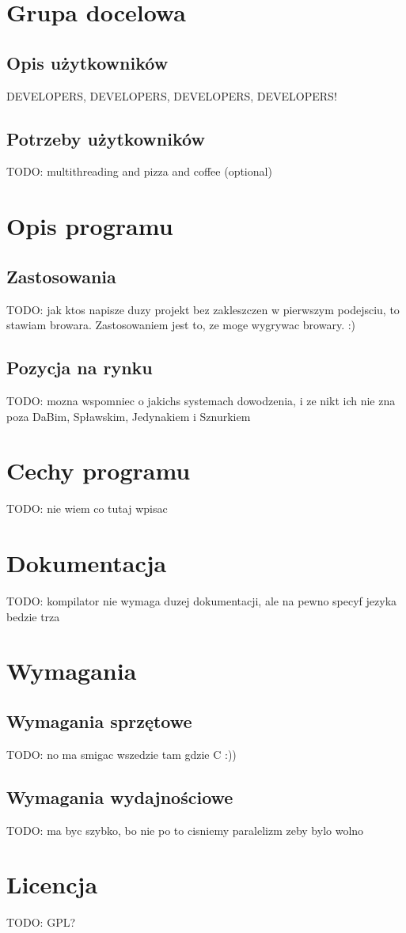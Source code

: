 \documentclass{documentation}
\begin{document}
\section{Grupa docelowa}
\subsection{Opis użytkowników}
DEVELOPERS, DEVELOPERS, DEVELOPERS, DEVELOPERS!
\subsection{Potrzeby użytkowników}
TODO: multithreading and pizza and coffee (optional)

\section{Opis programu}
\subsection{Zastosowania}
TODO: jak ktos napisze duzy projekt bez zakleszczen w pierwszym podejsciu, to stawiam browara. Zastosowaniem jest to, ze moge wygrywac browary. :)
\subsection{Pozycja na rynku}
TODO: mozna wspomniec o jakichs systemach dowodzenia, i ze nikt ich nie zna poza DaBim, Spławskim, Jedynakiem i Sznurkiem

\section{Cechy programu}
TODO: nie wiem co tutaj wpisac

\section{Dokumentacja}
TODO: kompilator nie wymaga duzej dokumentacji, ale na pewno specyf jezyka bedzie trza

\section{Wymagania}
\subsection{Wymagania sprzętowe}
TODO: no ma smigac wszedzie tam gdzie C :))

\subsection{Wymagania wydajnościowe}
TODO: ma byc szybko, bo nie po to cisniemy paralelizm zeby bylo wolno

\section{Licencja}
TODO: GPL?
\end{document}
